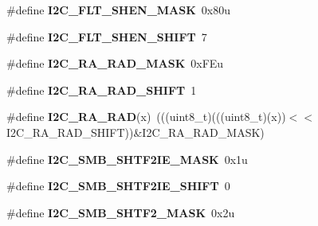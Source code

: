 \begin{DoxyCompactItemize}
\item 
\#define {\bfseries I2\+C\+\_\+\+F\+L\+T\+\_\+\+S\+H\+E\+N\+\_\+\+M\+A\+SK}~0x80u\hypertarget{group__I2C__Register__Masks_gac404fda03fc23c08a56018d6ab2fc977}{}\label{group__I2C__Register__Masks_gac404fda03fc23c08a56018d6ab2fc977}

\item 
\#define {\bfseries I2\+C\+\_\+\+F\+L\+T\+\_\+\+S\+H\+E\+N\+\_\+\+S\+H\+I\+FT}~7\hypertarget{group__I2C__Register__Masks_ga5d6c7b67f99e1f592d199bb77f7d5605}{}\label{group__I2C__Register__Masks_ga5d6c7b67f99e1f592d199bb77f7d5605}

\item 
\#define {\bfseries I2\+C\+\_\+\+R\+A\+\_\+\+R\+A\+D\+\_\+\+M\+A\+SK}~0x\+F\+Eu\hypertarget{group__I2C__Register__Masks_gaa39c37c0d41e4cdafc00884a2fc791fa}{}\label{group__I2C__Register__Masks_gaa39c37c0d41e4cdafc00884a2fc791fa}

\item 
\#define {\bfseries I2\+C\+\_\+\+R\+A\+\_\+\+R\+A\+D\+\_\+\+S\+H\+I\+FT}~1\hypertarget{group__I2C__Register__Masks_ga8571ae2c33f4ea6503f568c2151ef2a9}{}\label{group__I2C__Register__Masks_ga8571ae2c33f4ea6503f568c2151ef2a9}

\item 
\#define {\bfseries I2\+C\+\_\+\+R\+A\+\_\+\+R\+AD}(x)~(((uint8\+\_\+t)(((uint8\+\_\+t)(x))$<$$<$I2\+C\+\_\+\+R\+A\+\_\+\+R\+A\+D\+\_\+\+S\+H\+I\+FT))\&I2\+C\+\_\+\+R\+A\+\_\+\+R\+A\+D\+\_\+\+M\+A\+SK)\hypertarget{group__I2C__Register__Masks_gae2a3d76c69fe5e8947660274f6744031}{}\label{group__I2C__Register__Masks_gae2a3d76c69fe5e8947660274f6744031}

\item 
\#define {\bfseries I2\+C\+\_\+\+S\+M\+B\+\_\+\+S\+H\+T\+F2\+I\+E\+\_\+\+M\+A\+SK}~0x1u\hypertarget{group__I2C__Register__Masks_gad123ad3f9e1362d2ee5bd403cdf34327}{}\label{group__I2C__Register__Masks_gad123ad3f9e1362d2ee5bd403cdf34327}

\item 
\#define {\bfseries I2\+C\+\_\+\+S\+M\+B\+\_\+\+S\+H\+T\+F2\+I\+E\+\_\+\+S\+H\+I\+FT}~0\hypertarget{group__I2C__Register__Masks_ga431377427b6cae03a360309ac07a4559}{}\label{group__I2C__Register__Masks_ga431377427b6cae03a360309ac07a4559}

\item 
\#define {\bfseries I2\+C\+\_\+\+S\+M\+B\+\_\+\+S\+H\+T\+F2\+\_\+\+M\+A\+SK}~0x2u\hypertarget{group__I2C__Register__Masks_gac393f25577923046bb7755b7f398db70}{}\label{group__I2C__Register__Masks_gac393f25577923046bb7755b7f398db70}


\end{DoxyCompactItemize}
